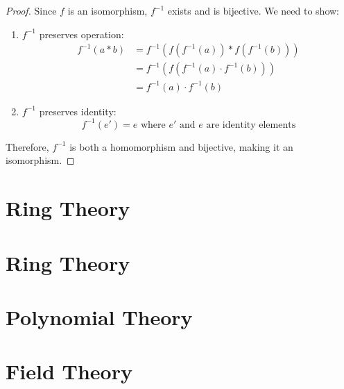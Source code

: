\documentclass[11pt,lang=en]{elegantbook}
\begin{document}
\begin{proof}
  Since $f$ is an isomorphism, $f^{-1}$ exists and is bijective. We need to show:
  \begin{enumerate}
    \item $f^{-1}$ preserves operation:
    \begin{align*}
      f^{-1}(a \ast b) &= f^{-1}(f(f^{-1}(a)) \ast f(f^{-1}(b))) \\
      &= f^{-1}(f(f^{-1}(a) \cdot f^{-1}(b))) \\
      &= f^{-1}(a) \cdot f^{-1}(b)
    \end{align*}
    
    \item $f^{-1}$ preserves identity:
    \[
      f^{-1}(e') = e \text{ where $e'$ and $e$ are identity elements}
    \]
  \end{enumerate}
  Therefore, $f^{-1}$ is both a homomorphism and bijective, making it an isomorphism.
\end{proof}

\chapter{Ring Theory}

\chapter{Ring Theory}

\chapter{Polynomial Theory}

\chapter{Field Theory}







\end{document}
